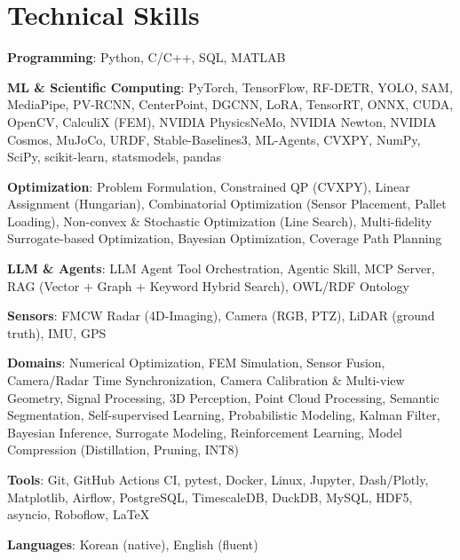 \documentclass[letterpaper,11pt]{article}
\begin{document}
\section{Technical Skills}
 \begin{itemize}[leftmargin=0.15in, label={}, itemsep=0pt, parsep=0pt, topsep=0pt]
    \small{\item{\textbf{Programming}{: Python, C/C++, SQL, MATLAB}}}
    \small{\item{\textbf{ML \& Scientific Computing}{: PyTorch, TensorFlow, RF-DETR, YOLO, SAM, MediaPipe, PV-RCNN, CenterPoint, DGCNN, LoRA, TensorRT, ONNX, CUDA, OpenCV, CalculiX (FEM), NVIDIA PhysicsNeMo, NVIDIA Newton, NVIDIA Cosmos, MuJoCo, URDF, Stable-Baselines3, ML-Agents, CVXPY, NumPy, SciPy, scikit-learn, statsmodels, pandas}}}
    \small{\item{\textbf{Optimization}{: Problem Formulation, Constrained QP (CVXPY), Linear Assignment (Hungarian), Combinatorial Optimization (Sensor Placement, Pallet Loading), Non-convex \& Stochastic Optimization (Line Search), Multi-fidelity Surrogate-based Optimization, Bayesian Optimization, Coverage Path Planning}}}
    \small{\item{\textbf{LLM \& Agents}{: LLM Agent Tool Orchestration, Agentic Skill, MCP Server, RAG (Vector + Graph + Keyword Hybrid Search), OWL/RDF Ontology}}}
    \small{\item{\textbf{Sensors}{: FMCW Radar (4D-Imaging), Camera (RGB, PTZ), LiDAR (ground truth), IMU, GPS}}}
    \small{\item{\textbf{Domains}{: Numerical Optimization, FEM Simulation, Sensor Fusion, Camera/Radar Time Synchronization, Camera Calibration \& Multi-view Geometry, Signal Processing, 3D Perception, Point Cloud Processing, Semantic Segmentation, Self-supervised Learning, Probabilistic Modeling, Kalman Filter, Bayesian Inference, Surrogate Modeling, Reinforcement Learning, Model Compression (Distillation, Pruning, INT8)}}}
    \small{\item{\textbf{Tools}{: Git, GitHub Actions CI, pytest, Docker, Linux, Jupyter, Dash/Plotly, Matplotlib, Airflow, PostgreSQL, TimescaleDB, DuckDB, MySQL, HDF5, asyncio, Roboflow, \LaTeX}}}
    \small{\item{\textbf{Languages}{: Korean (native), English (fluent)}}}
 \end{itemize}

\end{document}
